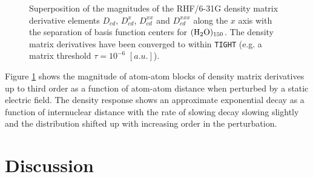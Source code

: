 \documentclass[prl,aps,letterpaper,twocolumn,showpacs,twocolumngrid,superbib]{revtex4}
\begin{document}
\begin{figure}[t]
  \caption{\protect
    Superposition of the magnitudes of the RHF/6-31G density matrix
    derivative elements $D_{cd}$, $D^{x}_{cd}$, $D^{xx}_{cd}$ and $D^{xxx}_{cd}$
    along the $x$ axis with the separation of basis function centers
    for $\rm (H_2O)_{150}$. The density matrix 
    derivatives have been converged to within {\tt TIGHT} (e.g. 
    a matrix threshold $\tau=10^{-6}$ $[a.u.]$).
  }\label{fig:Superposition_Decay}
\end{figure}

Figure \ref{fig:Superposition_Decay} shows the magnitude of atom-atom blocks 
of density matrix derivatives up to third order as a function of atom-atom distance 
when perturbed by a static electric field.  The density response shows an approximate 
exponential decay as a function of internuclear distance with the rate of slowing decay
slowing slightly and the distribution shifted up with increasing order in the perturbation.



\section{Discussion}
\end{document}
